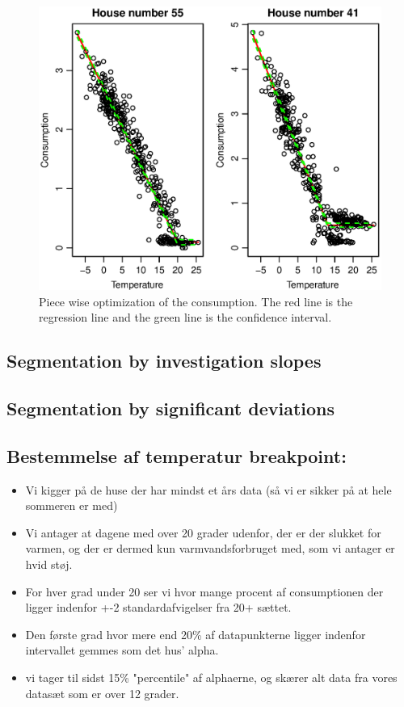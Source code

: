 \begin{figure}[H]
    \centering
    \includegraphics[width=\textwidth]{../../../figures/Consumption-PW.eps}
    \caption{Piece wise optimization of the consumption. The red line is the regression line and the green line is the confidence interval.}
    \label{fig: Consumption-PW}
\end{figure}
\subsection{Segmentation by investigation slopes}

\subsection{Segmentation by significant deviations}

\subsection{Bestemmelse af temperatur breakpoint:}
\begin{itemize}
    \item Vi kigger på de huse der har mindst et års data (så vi er sikker på at hele sommeren er med)
    \item Vi antager at dagene med over 20 grader udenfor, der er der slukket for varmen, og der er dermed kun varmvandsforbruget med, som vi antager er hvid støj.
    \item For hver grad under 20 ser vi hvor mange procent af consumptionen der ligger indenfor +-2 standardafvigelser fra 20+ sættet.
    \item Den første grad hvor mere end 20\% af datapunkterne ligger indenfor intervallet gemmes som det hus' alpha.
    \item vi tager til sidst 15\% "percentile" af alphaerne, og skærer alt data fra vores datasæt som er over 12 grader.
\end{itemize}

